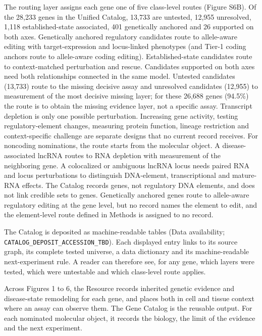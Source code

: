 The routing layer assigns each gene one of five class-level routes (Figure S6B). Of the 28,233 genes in the Unified Catalog, 13,733 are untested,
12,955 unresolved, 1,118 established-state associated, 401 genetically anchored
and 26 supported on both axes. Genetically anchored regulatory candidates route
to allele-aware editing with target-expression and locus-linked phenotypes (and Tier-1 coding anchors route to allele-aware coding editing).
Established-state candidates route to context-matched perturbation and rescue.
Candidates supported on both axes need both relationships connected in the same
model. Untested candidates (13,733) route to the missing decisive assay and
unresolved candidates (12,955) to measurement of the most decisive missing layer;
for these 26,688 genes (94.5\%) the route is to obtain the missing evidence
layer, not a specific assay. Transcript
depletion is only one possible perturbation. Increasing gene activity, testing
regulatory-element changes, measuring protein function, lineage restriction and
context-specific challenge are separate designs that no current record
receives. For noncoding nominations,
the route starts from the molecular object. A disease-associated lncRNA routes
to RNA depletion with measurement of the neighboring gene. A colocalized or
ambiguous lncRNA locus needs paired RNA and locus perturbations to distinguish
DNA-element, transcriptional and mature-RNA effects. The Catalog records genes, not
regulatory DNA elements, and does not link credible sets to genes. Genetically
anchored genes route to allele-aware regulatory editing at the gene level, but no
record names the element to edit, and the element-level route defined in Methods
is assigned to no record.

The Catalog is deposited as machine-readable tables (Data availability;
\texttt{CATALOG\_DEPOSIT\_ACCESSION\_TBD}). Each displayed entry links to its source graph, its
complete tested universe, a data dictionary and its machine-readable
next-experiment rule. A reader can therefore see, for any gene, which layers
were tested, which were untestable and which class-level route applies.

Across Figures 1 to 6, the Resource records inherited genetic evidence and
disease-state remodeling for each gene, and places both in cell and tissue
context where an assay can observe them. The Gene Catalog is the reusable
output. For each nominated molecular object, it records the biology, the limit
of the evidence and the next experiment.

